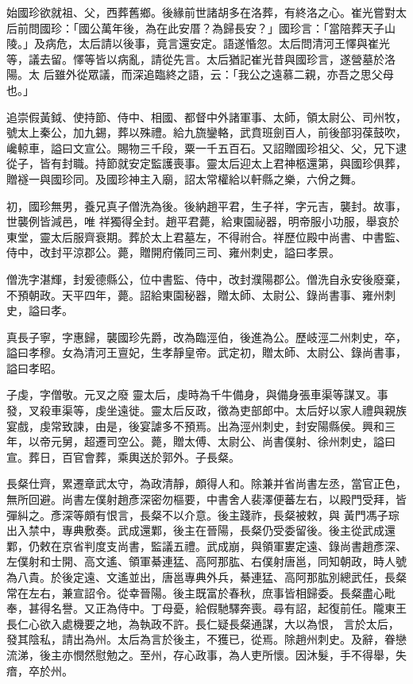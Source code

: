 \begin{pinyinscope}
 始國珍欲就祖、父，西葬舊鄉。後緣前世諸胡多在洛葬，有終洛之心。崔光嘗對太后前問國珍：「國公萬年後，為在此安厝？為歸長安？」國珍言：「當陪葬天子山陵。」及病危，太后請以後事，竟言還安定。語遂惛忽。太后問清河王懌與崔光等，議去留。懌等皆以病亂，請從先言。太后猶記崔光昔與國珍言，遂營墓於洛陽。太
 后雖外從眾議，而深追臨終之語，云：「我公之遠慕二親，亦吾之思父母也。」



 追崇假黃鉞、使持節、侍中、相國、都督中外諸軍事、太師，領太尉公、司州牧，號太上秦公，加九錫，葬以殊禮。給九旒鑾輅，武賁班劍百人，前後部羽葆鼓吹，巉輬車，謚曰文宣公。賜物三千段，粟一千五百石。又詔贈國珍祖父、父，兄下逮從子，皆有封職。持節就安定監護喪事。靈太后迎太上君神柩還第，與國珍俱葬，贈襚一與國珍同。及國珍神主入廟，詔太常權給以軒縣之樂，六佾之舞。



 初，國珍無男，養兄真子僧洗為後。後納趙平君，生子祥，字元吉，襲封。故事，世襲例皆減邑，唯
 祥獨得全封。趙平君薨，給東園祕器，明帝服小功服，舉哀於東堂，靈太后服齊衰期。葬於太上君墓左，不得祔合。祥歷位殿中尚書、中書監、侍中，改封平涼郡公。薨，贈開府儀同三司、雍州刺史，謚曰孝景。



 僧洗字湛輝，封爰德縣公，位中書監、侍中，改封濮陽郡公。僧洗自永安後廢棄，不預朝政。天平四年，薨。詔給東園秘器，贈太師、太尉公、錄尚書事、雍州刺史，謚曰孝。



 真長子寧，字惠歸，襲國珍先爵，改為臨涇伯，後進為公。歷岐涇二州刺史，卒，謚曰孝穆。女為清河王亶妃，生孝靜皇帝。武定初，贈太師、太尉公、錄尚書事，謚曰孝昭。



 子虔，字僧敬。元叉之廢
 靈太后，虔時為千牛備身，與備身張車渠等謀叉。事發，叉殺車渠等，虔坐遠徙。靈太后反政，徵為吏部郎中。太后好以家人禮與親族宴戲，虔常致諫，由是，後宴謔多不預焉。出為涇州刺史，封安陽縣侯。興和三年，以帝元舅，超遷司空公。薨，贈太傅、太尉公、尚書僕射、徐州刺史，謚曰宣。葬日，百官會葬，乘輿送於郭外。子長粲。



 長粲仕齊，累遷章武太守，為政清靜，頗得人和。除兼并省尚書左丞，當官正色，無所回避。尚書左僕射趙彥深密勿樞要，中書舍人裴澤便蕃左右，以殿門受拜，皆彈糾之。彥深等頗有恨言，長粲不以介意。後主踐祚，長粲被敕，與
 黃門馮子琮出入禁中，專典敷奏。武成還鄴，後主在晉陽，長粲仍受委留後。後主從武成還鄴，仍敕在京省判度支尚書，監議五禮。武成崩，與領軍婁定遠、錄尚書趙彥深、左僕射和士開、高文遙、領軍綦連猛、高阿那肱、右僕射唐邕，同知朝政，時人號為八貴。於後定遠、文遙並出，唐邕專典外兵，綦連猛、高阿那肱別總武任，長粲常在左右，兼宣詔令。從幸晉陽。後主既富於春秋，庶事皆相歸委。長粲盡心毗奉，甚得名譽。又正為侍中。丁母憂，給假馳驛奔喪。尋有詔，起復前任。隴東王長仁心欲入處機要之地，為執政不許。長仁疑長粲通謀，大以為恨，
 言於太后，發其陰私，請出為州。太后為言於後主，不獲已，從焉。除趙州刺史。及辭，眷戀流涕，後主亦憫然慰勉之。至州，存心政事，為人吏所懷。因沐髮，手不得舉，失瘖，卒於州。




\end{pinyinscope}
